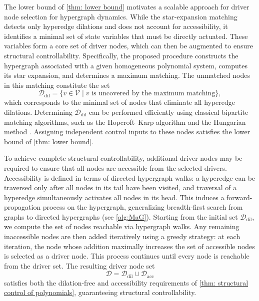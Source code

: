 \documentclass[journal,twoside,web]{ieeecolor}
\newcommand{\Ds}{\mathcal{D}}
\newcommand{\Vs}{\mathcal{V}}
\begin{document}
The lower bound of \cref{thm: lower bound} motivates a scalable approach for driver node selection for hypergraph dynamics.
%
While the star-expansion matching detects only hyperedge dilations and does not account for accessibility, it identifies a minimal set of state variables that must be directly actuated.
%
These variables form a core set of driver nodes, which can then be augmented to ensure structural controllability.
%
Specifically, the proposed procedure constructs the hypergraph associated with a given homogeneous polynomial system, computes its star expansion, and determines a maximum matching. The unmatched nodes in this matching constitute the set
\[
\Ds_{\mathrm{dil}} = \{ v \in \Vs \mid v \text{ is uncovered by the maximum matching} \},
\]
which corresponds to the minimal set of nodes that eliminate all hyperedge dilations.
%
Determining $\Ds_{\mathrm{dil}}$ can be performed efficiently using classical bipartite matching algorithms, such as the Hopcroft–Karp algorithm and the Hungarian method \cite{hopcroft1973n, kuhn1955hungarian}.
%
Assigning independent control inputs to these nodes satisfies the lower bound of \cref{thm: lower bound}.



To achieve complete structural controllability, additional driver nodes may be required to ensure that all nodes are accessible from the selected drivers. Accessibility is defined in terms of directed hypergraph walks: a hyperedge can be traversed only after all nodes in its tail have been visited, and traversal of a hyperedge simultaneously activates all nodes in its head. This induces a forward-propagation process on the hypergraph, generalizing breadth-first search from graphs to directed hypergraphs (see \cref{alg:MaG}).
%
Starting from the initial set \(\Ds_{\mathrm{dil}}\), we compute the set of nodes reachable via hypergraph walks. Any remaining inaccessible nodes are then added iteratively using a greedy strategy: at each iteration, the node whose addition maximally increases the set of accessible nodes is selected as a driver node. This process continues until every node is reachable from the driver set. The resulting driver node set
\[
\Ds = \Ds_{\mathrm{dil}} \cup \Ds_{\mathrm{acc}}
\]
satisfies both the dilation-free and accessibility requirements of \cref{thm: structural control of polynomials}, guaranteeing structural controllability.
\end{document}
